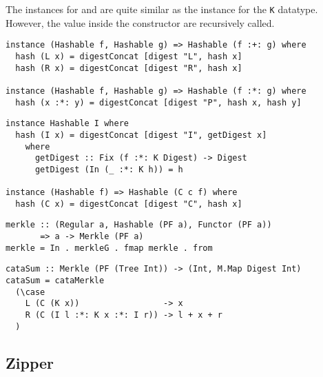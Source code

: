 The instances for \inlinehaskell{:+:} and \inlinehaskell{:*:} are quite similar as the instance for the \texttt{K} datatype. However, the value inside the constructor are recursively called.

\begin{verbatim}
instance (Hashable f, Hashable g) => Hashable (f :+: g) where
  hash (L x) = digestConcat [digest "L", hash x]
  hash (R x) = digestConcat [digest "R", hash x]

instance (Hashable f, Hashable g) => Hashable (f :*: g) where
  hash (x :*: y) = digestConcat [digest "P", hash x, hash y]
\end{verbatim}

\begin{verbatim}
instance Hashable I where
  hash (I x) = digestConcat [digest "I", getDigest x]
    where
      getDigest :: Fix (f :*: K Digest) -> Digest
      getDigest (In (_ :*: K h)) = h

instance (Hashable f) => Hashable (C c f) where
  hash (C x) = digestConcat [digest "C", hash x]
\end{verbatim}

\begin{verbatim}
merkle :: (Regular a, Hashable (PF a), Functor (PF a))
       => a -> Merkle (PF a)
merkle = In . merkleG . fmap merkle . from
\end{verbatim}

\begin{verbatim}
cataSum :: Merkle (PF (Tree Int)) -> (Int, M.Map Digest Int)
cataSum = cataMerkle
  (\case
    L (C (K x))                 -> x
    R (C (I l :*: K x :*: I r)) -> l + x + r
  )
\end{verbatim}





\subsection{Zipper}